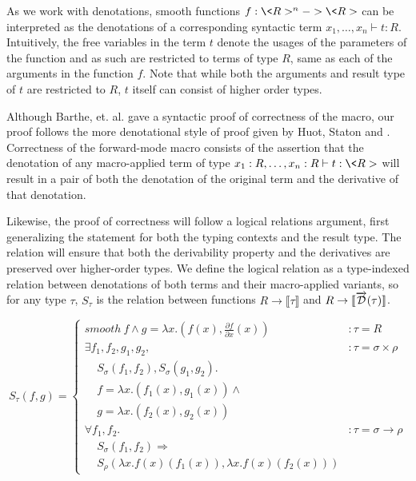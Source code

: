 \documentclass[11pt, final]{article}
\begin{document}

  As we work with denotations, smooth functions $f : \<R>^n -> \<R>$ can be interpreted as the denotations of a corresponding syntactic term $x_1, \dots, x_n \vdash t : R$.
  Intuitively, the free variables in the term $t$ denote the usages of the parameters of the function and as such are restricted to terms of type $R$, same as each of the arguments in the function $f$.
  Note that while both the arguments and result type of $t$ are restricted to $R$, $t$ itself can consist of higher order types.

  Although Barthe, et. al.\cite{barthe2020versatility} gave a syntactic proof of correctness of the macro, our proof follows the more denotational style of proof given by Huot, Staton and \Vakar{}\cite{huot2020correctness}.
  Correctness of the forward-mode macro consists of the assertion that the denotation of any macro-applied term of type $x_1 : R, \dots, x_n : R \vdash t : \<R>$ will result in a pair of both the denotation of the original term and the derivative of that denotation.

  Likewise, the proof of correctness will follow a logical relations argument, first generalizing the statement for both the typing contexts and the result type.
  The relation will ensure that both the derivability property and the derivatives are preserved over higher-order types.
  We define the logical relation as a type-indexed relation between denotations of both terms and their macro-applied variants, so for any type $\tau$, $S_\tau$ is the relation between functions $R \rightarrow \llbracket \tau \rrbracket$ and $R \rightarrow \llbracket \overrightarrow{\mathcal{D}}(\tau) \rrbracket$.

  \begin{equation}
    S_\tau(f, g) =
      \left\{
        \begin{array}{ll}
          smooth\ f \wedge
            g = \lambda x. (f(x), \frac{\partial f}{\partial x}(x))
            & : \tau = R \\
          \exists f_1, f_2, g_1, g_2,
            & : \tau = \sigma \times \rho \\
            \;\;\;\;S_\sigma(f_1, f_2), S_\sigma(g_1, g_2). \\
            \;\;\;\;f = \lambda x. (f_1(x), g_1(x)) \wedge \\
            \;\;\;\;g = \lambda x. (f_2(x), g_2(x)) \\
          \forall f_1, f_2.
            & : \tau = \sigma \rightarrow \rho \\
            \;\;\;\;S_\sigma(f_1, f_2) \Rightarrow \\
            \;\;\;\;S_\rho(\lambda x. f(x)(f_1(x)),\lambda x. f(x)(f_2(x)))
        \end{array}
      \right.
  \label{eqn:lr_base}
  \end{equation}
\end{document}
